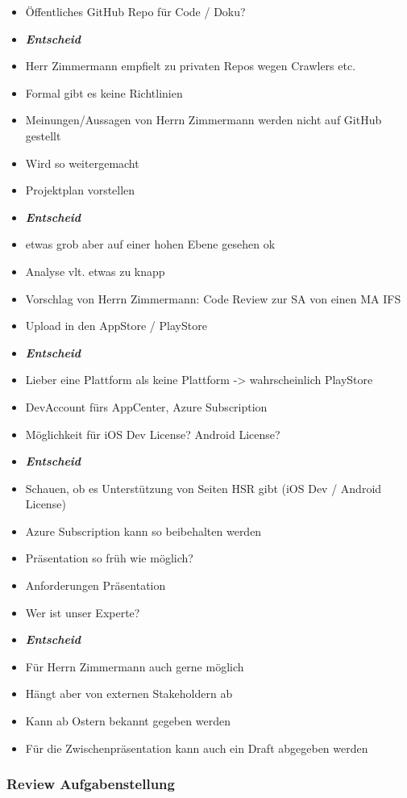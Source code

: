 \begin{itemize}
\item
  Öffentliches GitHub Repo für Code / Doku?
\item \emph{\textbf{Entscheid}}
\item
  Herr Zimmermann empfielt zu privaten Repos wegen Crawlers etc.
\item
  Formal gibt es keine Richtlinien
\item
  Meinungen/Aussagen von Herrn Zimmermann werden nicht auf GitHub
  gestellt
\item
  Wird so weitergemacht
\item
  Projektplan vorstellen 
\item \emph{\textbf{Entscheid}}
\item
  etwas grob aber auf einer hohen Ebene gesehen ok
\item
  Analyse vlt. etwas zu knapp
\item
  Vorschlag von Herrn Zimmermann: Code Review zur SA von einen MA IFS
\item
  Upload in den AppStore / PlayStore 
\item \emph{\textbf{Entscheid}}
\item
  Lieber eine Plattform als keine Plattform -\textgreater{}
  wahrscheinlich PlayStore
\item
  DevAccount fürs AppCenter, Azure Subscription
\item
  Möglichkeit für iOS Dev License? Android License?
\item \emph{\textbf{Entscheid}}
\item
  Schauen, ob es Unterstützung von Seiten HSR gibt (iOS Dev / Android
  License)
\item
  Azure Subscription kann so beibehalten werden
\item
  Präsentation so früh wie möglich?
\item
  Anforderungen Präsentation
\item
  Wer ist unser Experte? 
\item \emph{\textbf{Entscheid}}
\item
  Für Herrn Zimmermann auch gerne möglich
\item
  Hängt aber von externen Stakeholdern ab
\item
  Kann ab Ostern bekannt gegeben werden
\item
  Für die Zwischenpräsentation kann auch ein Draft abgegeben werden
\end{itemize}

\hypertarget{review-aufgabenstellung}{%
\subsubsection*{Review Aufgabenstellung}\label{review-aufgabenstellung}}

